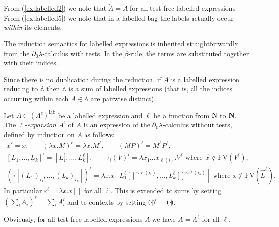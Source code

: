 \documentclass{LMCS}
\newcommand{\nak}[1]{\tilde{#1}}
\newcommand{\nat}{\mathbf{N}}
\newcommand{\dzlam}{\ensuremath{\partial_0\lambda}}
\newcommand{\lam}{\ensuremath{\lambda}}
\renewcommand{\hole}[1]{\llparenthesis #1\rrparenthesis}
\newcommand{\FV}{\mathrm{FV}}
\newcommand{\Set}[1]{\Lambda^{#1}}
\newcommand{\seq}[1]{\vec{#1}}
\newcommand{\sA}{\mathbb{A}}
\newcommand{\gt}{\ensuremath{\tau}}
\newcommand{\gto}{\ensuremath{\bar\tau}}
\newcommand\lab{\mathrm{lab}}
\begin{document}
\noindent From (\ref{ex:labelled2}) we note that $\nak A = A$ for all test-free labelled expressions.
From (\ref{ex:labelled5}) we note that in a labelled bag the labels actually occur \emph{within} its elements.

\begin{defi} 
The reduction semantics for labelled expressions is inherited straightforwardly from the $\dzlam$-calculus with tests. 
In the $\beta$-rule, the terms are substituted together with their indices.
\end{defi}

Since there is no duplication during the reduction, if $A$ is a labelled expression reducing to $\sA$ then $\sA$
is a sum of labelled expressions (that is, all the indices occurring within each $A\in\sA$ are pairwise distinct).


\begin{defi}\label{def:labelling-expansion}
Let $A\in(\Set{e})^\lab$ be a labelled expression and $\ell$ be a function from $\nat$ to $\nat$.
The \emph{$\ell$-expansion}  $A^\ell$ of $A$ is an expression of the \dzlam-calculus without tests, defined by induction on $A$ as follows:
\begin{gather*}
x^\ell = x,\qquad (\lam x.M)^\ell = \lam x.M^\ell,\qquad (MP)^\ell = M^\ell P^\ell,\\
[L_1,\dots,L_k]^\ell = [L_1^\ell,\dots,L_k^\ell],\qquad
\gto_i(V)^\ell = \lam x_1\ldots x_{\ell(i)}.V^\ell\textrm{ where $\seq x\notin \FV(V^\ell)$},\\
(\gt[(L_1)_{i_1},\dots,(L_k)_{i_k}])^\ell =  \lam x.x[L_1^\ell[]^{\sim\ell(i_1)},\dots,L_k^\ell[]^{\sim\ell(i_k)}]\textrm{ where $x\notin\FV(\seq L^\ell)$}.
\end{gather*}
In particular $\varepsilon^\ell = \lam x.x[]$ for all $\ell$.
This is extended to sums by setting $(\sum_i A_i)^\ell = \sum_i A_i^\ell$ and to contexts by setting $\hole{\cdot}^\ell = \hole{\cdot}$.
\end{defi} 

Obviously, for all test-free labelled expressions $A$ we have $A = A^\ell$ for all $\ell$.
\end{document}

